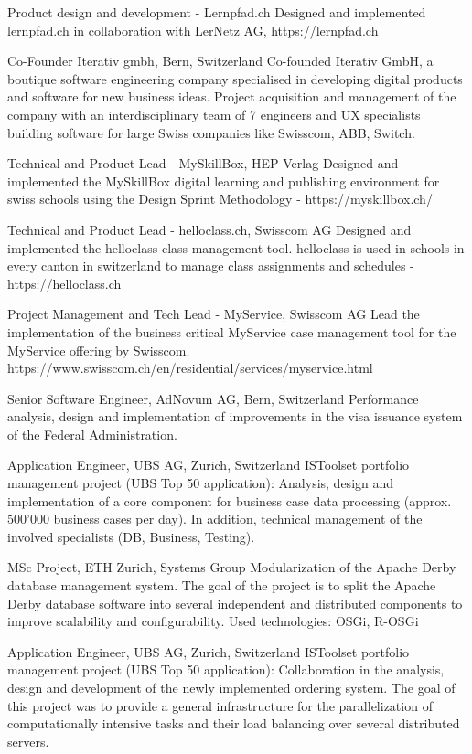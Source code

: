 \documentclass[10pt]{moderncv}
\begin{document}
\workitem{}
{Product design and development - Lernpfad.ch}
{Designed and implemented lernpfad.ch in collaboration with LerNetz AG, https://lernpfad.ch}


{Co-Founder Iterativ gmbh, Bern, Switzerland}
{Co-founded Iterativ GmbH, a boutique software engineering company specialised in developing digital 
products and software for new business ideas. Project acquisition and management of the company 
with an interdisciplinary team of 7 engineers and UX specialists building software for large Swiss 
companies like Swisscom, ABB, Switch.}

\workitem{}
{Technical and Product Lead - MySkillBox, HEP Verlag}
{Designed and implemented the MySkillBox digital learning and publishing environment for swiss 
schools using the Design Sprint Methodology - https://myskillbox.ch/}

\workitem{}
{Technical and Product Lead - helloclass.ch, Swisscom AG}
{Designed and implemented the helloclass class management tool. helloclass is used in schools in 
every canton in switzerland to manage class assignments and schedules - https://helloclass.ch}

\workitem{}
{Project Management and Tech Lead - MyService, Swisscom AG}
{Lead the implementation of the business critical MyService case management tool for the MyService 
offering by Swisscom. \smallpara https://www.swisscom.ch/en/residential/services/myservice.html}


{Senior Software Engineer, AdNovum AG, Bern, Switzerland}
{Performance analysis, design and implementation of improvements in the visa issuance system of 
the Federal Administration.}


{Application Engineer, UBS AG, Zurich, Switzerland}
{ISToolset portfolio management project (UBS Top 50 application): 
Analysis, design and implementation of a core component for business case data processing (approx. 
500'000 business cases per day). In addition, technical management of the involved specialists 
(DB, Business, Testing).}


{MSc Project, ETH Zurich, Systems Group}
{Modularization of the Apache Derby database management system.
The goal of the project is to split the Apache Derby database software into several independent 
and distributed components to improve scalability and configurability. Used technologies: OSGi, R-OSGi}


{Application Engineer, UBS AG, Zurich, Switzerland}
{ISToolset portfolio management project (UBS Top 50 application):
Collaboration in the analysis, design and development of the newly implemented ordering system. 
The goal of this project was to provide a general infrastructure for the parallelization of computationally 
intensive tasks and their load balancing over several distributed servers.}
\end{document}
